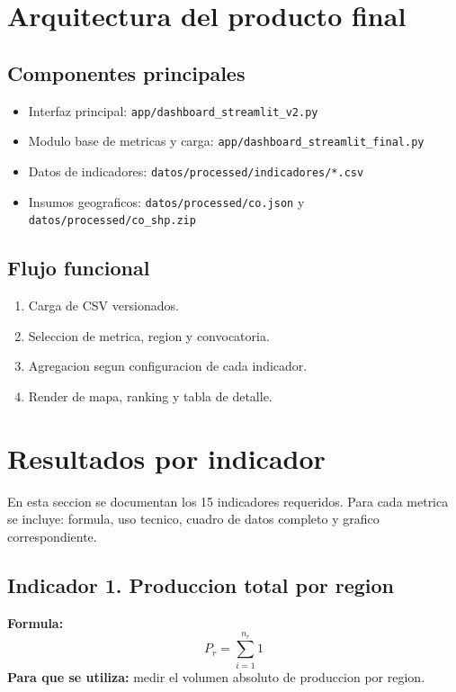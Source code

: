 \documentclass[12pt,letterpaper]{article}
\begin{document}
\section{Arquitectura del producto final}

\subsection{Componentes principales}

\begin{itemize}
  \item Interfaz principal: \texttt{app/dashboard\_streamlit\_v2.py}
  \item Modulo base de metricas y carga: \texttt{app/dashboard\_streamlit\_final.py}
  \item Datos de indicadores: \texttt{datos/processed/indicadores/*.csv}
  \item Insumos geograficos: \texttt{datos/processed/co.json} y \texttt{datos/processed/co\_shp.zip}
\end{itemize}

\subsection{Flujo funcional}

\begin{enumerate}[label=\arabic*.]
  \item Carga de CSV versionados.
  \item Seleccion de metrica, region y convocatoria.
  \item Agregacion segun configuracion de cada indicador.
  \item Render de mapa, ranking y tabla de detalle.
\end{enumerate}

\section{Resultados por indicador}

En esta seccion se documentan los 15 indicadores requeridos. Para cada metrica se incluye: formula, uso tecnico, cuadro de datos completo y grafico correspondiente.

\subsection{Indicador 1. Produccion total por region}
\textbf{Formula:}
\[
P_r = \sum_{i=1}^{n_r} 1
\]
\textbf{Para que se utiliza:} medir el volumen absoluto de produccion por region.
\end{document}
